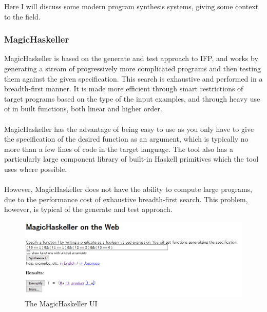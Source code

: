Here I will discuss some modern program synthesis systems, giving some context to the field.

\subsubsection{MagicHaskeller}
MagicHaskeller \cite{Katayama2012} is based on the generate and test approach to IFP, and works by generating a stream of progressively more complicated programs and then testing them against the given specification. This search is exhaustive and performed in a breadth-first manner. It is made more efficient through smart restrictions of target programs based on the type of the input examples, and through heavy use of in built functions, both linear and higher order. \\ \\
MagicHaskeller has the advantage of being easy to use as you only have to give the specification of the desired function as an argument, which is typically no more than a few lines of code in the target language. The tool also has a particularly large component library of built-in Haskell primitives which the tool uses where possible.\\ \\
However, MagicHaskeller does not have the ability to compute large programs, due to the performance cost of exhaustive breadth-first search. This problem, however, is typical of the generate and test approach.

\begin{figure}[h!]
\centering
\includegraphics[width=\textwidth]{C7/magichaskeller.png}
\caption{The MagicHaskeller UI}
\label{fig:magichaskeller}
\end{figure}

